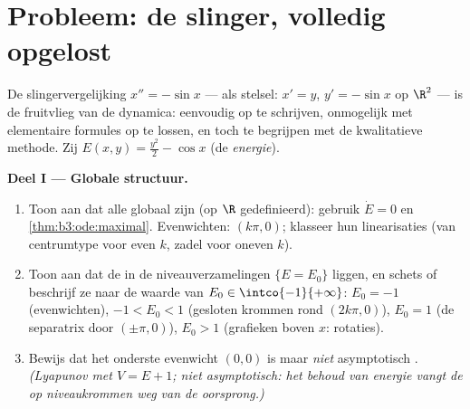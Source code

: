 \section{Probleem: de slinger, volledig opgelost}

\begin{problem}\label{pb:b3:ode:1}
De slingervergelijking $x'' = -\sin x$ --- als stelsel: $x' = y$,
$y' = -\sin x$ op $\R^2$ --- is de fruitvlieg van de dynamica:
eenvoudig op te schrijven, onmogelijk met elementaire formules op
te lossen, en toch  te begrijpen met de kwalitatieve
methode. Zij $E(x, y) = \frac{y^2}2 - \cos x$ (de
\emph{energie}).

\medskip
\noindent\textbf{Deel I --- Globale structuur.}
\begin{enumerate}
  \item Toon aan dat alle  globaal zijn (op
        $\R$ gedefinieerd): gebruik $\dot E = 0$ en
        \cref{thm:b3:ode:maximal}. Evenwichten: $(k\pi, 0)$;
        klasseer hun linearisaties (van centrumtype voor even
        $k$, zadel voor oneven $k$).
  \item Toon aan dat de  in de niveauverzamelingen $\{E =
        E_0\}$ liggen, en schets of beschrijf ze naar de waarde
        van $E_0 \in \intco{-1}{+\infty}$: $E_0 = -1$
        (evenwichten), $-1 < E_0 < 1$ (gesloten krommen rond
        $(2k\pi, 0)$), $E_0 = 1$ (de separatrix door $(\pm\pi,
        0)$), $E_0 > 1$ (grafieken boven $x$: rotaties).
  \item Bewijs dat het onderste evenwicht $(0,0)$  is maar
        \emph{niet} asymptotisch . \emph{(Lyapunov met $V
        = E + 1$; niet asymptotisch: het behoud van energie vangt
        de  op niveaukrommen weg van de oorsprong.)}
\end{enumerate}


\end{problem}
